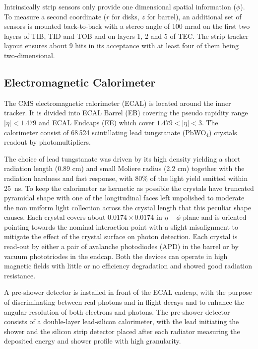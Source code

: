 Intrinsically strip sensors only provide one dimensional spatial information ($\phi$). To measure a second coordinate ($r$ for disks, $z$ for barrel), an additional set of sensors is mounted back-to-back with a stereo angle of 100 mrad on the first two layers of TIB, TID and TOB and on layers 1, 2 and 5 of TEC. The strip tracker layout ensures about 9 hits in its acceptance with at least four of them being two-dimensional.


\subsection{Electromagnetic Calorimeter}

The CMS electromagnetic calorimeter (ECAL) is located around the inner tracker. It is divided into ECAL Barrel (EB) covering the pseudo rapidity range $|\eta| < 1.479$ and ECAL Endcaps (EE) which cover $1.479 < |\eta| < 3$. 
The calorimeter consist of 68\,524 scintillating lead tungstanate (PbWO$_4$) crystals readout by photomultipliers. 

The choice of lead tungstanate was driven by its high density yielding a short radiation length (0.89 cm) and small Moliere radius (2.2 cm) together with the radiation hardness and fast response, with 80\% of the light yield emitted within 25~ns. To keep the calorimeter as hermetic as possible the crystals have truncated pyramidal shape with one of the longitudinal faces left unpolished to moderate the non uniform light collection across the crystal length that this peculiar shape causes. Each crystal covers about $0.0174 \times 0.0174$ in $\eta-\phi$ plane and is oriented pointing towards the nominal interaction point with a slight misalignment to mitigate the effect of the crystal surface on photon detection. Each crystal is read-out by either a pair of avalanche photodiodes (APD) in the barrel or by vacuum phototriodes in the endcap. Both the devices can operate in high magnetic fields with little or no efficiency degradation and showed good radiation resistance.

A pre-shower detector is installed in front of the ECAL endcap, with the purpose of discriminating between real photons and in-flight \piz decays and to enhance the angular resolution of both electrons and photons. The pre-shower detector consists of a double-layer lead-silicon calorimeter, with the lead initiating the shower and the silicon strip detector placed after each radiator measuring the deposited energy and shower profile with high granularity.

